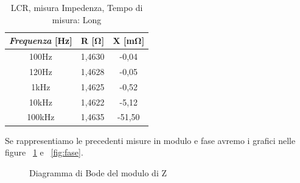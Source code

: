 \begin{table}[!ht]
\centering
\begin{tabular}{|c|c|c|}
\hline
\textit{\textbf{Frequenza}} \textbf{[Hz]} & \textbf{R [$\bm{\Omega}$]}  & \textbf{X [m$\bm{\Omega}$]}  \\ \hline
100Hz                       & 1,4630    & -0,04      \\ \hline
120Hz                       & 1,4628    & -0,05      \\ \hline
1kHz                        & 1,4625    & -0,52      \\ \hline
10kHz                       & 1,4622    & -5,12      \\ \hline
100kHz                      & 1,4635    & -51,50     \\ \hline
\end{tabular}
\caption{LCR, misura Impedenza, Tempo di misura: Long}
\label{tab:lcr_z}
\end{table}
\FloatBarrier


Se rappresentiamo le precedenti misure in modulo e fase avremo i grafici nelle figure ~\ref{fig:modulo} e ~\ref{fig:fase}.
%

\begin{figure}[h]
    \centering
    \caption{Diagramma di Bode del modulo di Z}
    \label{fig:modulo}
\end{figure}
\FloatBarrier
\clearpage

